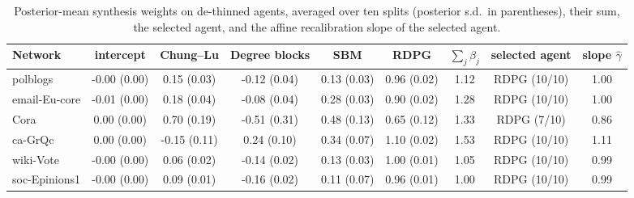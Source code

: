 \documentclass[12pt]{article}
\begin{document}
\begin{table}[ht]
\centering
\caption{Posterior-mean synthesis weights on de-thinned agents, averaged over ten splits (posterior s.d.\ in parentheses), their sum, the selected agent, and the affine recalibration slope of the selected agent.}
\label{tab:weightsupp}
\begin{tabular}{lcccccccc}
\toprule
Network & intercept & Chung--Lu & Degree blocks & SBM & RDPG & $\sum_j \beta_j$ & selected agent & slope $\hat\gamma$ \\
\midrule
polblogs & -0.00 (0.00) & 0.15 (0.03) & -0.12 (0.04) & 0.13 (0.03) & 0.96 (0.02) & 1.12 & RDPG (10/10) & 1.00 \\
email-Eu-core & -0.01 (0.00) & 0.18 (0.04) & -0.08 (0.04) & 0.28 (0.03) & 0.90 (0.02) & 1.28 & RDPG (10/10) & 1.00 \\
Cora & 0.00 (0.00) & 0.70 (0.19) & -0.51 (0.31) & 0.48 (0.13) & 0.65 (0.12) & 1.33 & RDPG (7/10) & 0.86 \\
ca-GrQc & 0.00 (0.00) & -0.15 (0.11) & 0.24 (0.10) & 0.34 (0.07) & 1.10 (0.02) & 1.53 & RDPG (10/10) & 1.11 \\
wiki-Vote & -0.00 (0.00) & 0.06 (0.02) & -0.14 (0.02) & 0.13 (0.03) & 1.00 (0.01) & 1.05 & RDPG (10/10) & 0.99 \\
soc-Epinions1 & -0.00 (0.00) & 0.09 (0.01) & -0.16 (0.02) & 0.11 (0.07) & 0.96 (0.01) & 1.00 & RDPG (10/10) & 0.99 \\
\bottomrule
\end{tabular}

\end{table}
\end{document}
